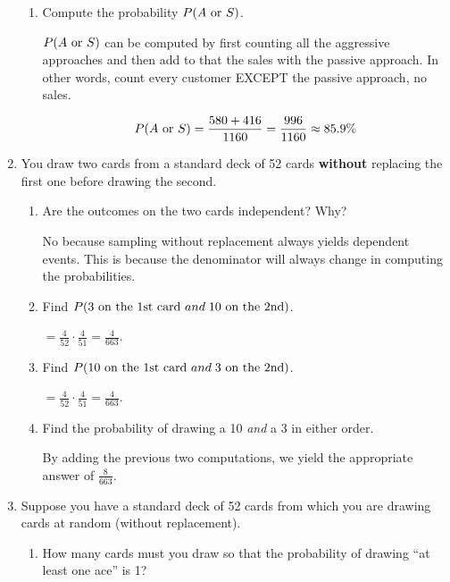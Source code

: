 \documentclass{article}
\newcommand{\answer}[1]{\color{white}#1}
\begin{document}
\begin{enumerate}
\begin{enumerate}
	\item Compute the probability $P(A \textnormal{ or } S)$. 
	
	{\answer $P(A \textnormal{ or } S)$ can be computed by first counting all the aggressive approaches and then add to that the sales with the passive approach.  In other words, count every customer EXCEPT the passive approach, no sales. 
	
	$$P(A \textnormal{ or } S) = \frac{580 + 416}{1160} = \frac{996}{1160} \approx 85.9\%$$} 
	
	\end{enumerate}

\newpage
	
\item You draw two cards from a standard deck of 52 cards \textbf{without} replacing the first one before drawing the second.

    \begin{enumerate}
    
        \item Are the outcomes on the two cards independent? Why?
        
        {\answer No because sampling without replacement always yields dependent events. This is because the denominator will always change in computing the probabilities.}
        
        \item Find $P(3 \textnormal{ on the 1st card } and\; 10 \textnormal{ on the 2nd})$.
        
        {\answer $=\frac{4}{52}\cdot \frac{4}{51} = \frac{4}{663}$.}
        
        \item Find $P(10 \textnormal{ on the 1st card } and\; 3 \textnormal{ on the 2nd})$.
        
        {\answer $=\frac{4}{52}\cdot \frac{4}{51} = \frac{4}{663}$.}
        
        \item Find the probability of drawing a 10 \textit{and} a 3 in either order.
        
        {\answer By adding the previous two computations, we yield the appropriate answer of $\frac{8}{663}$.}
        
    \end{enumerate}

\medskip

\item Suppose you have a standard deck of 52 cards from which you are drawing cards at random (without replacement).
	\begin{enumerate}
	\item How many cards must you draw so that the probability of drawing ``at least one ace'' is 1? 
	

\end{enumerate}
\end{enumerate}
\end{document}
